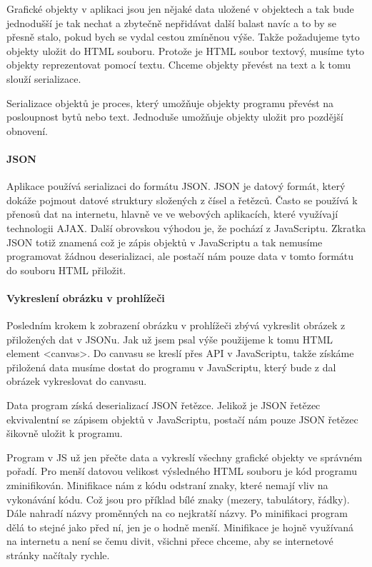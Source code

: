 \documentclass[
  field=inf,
  biblatex,
  glossaries,
  index
]{kidiplom}
\begin{document}
Grafické objekty v aplikaci jsou jen nějaké data uložené v objektech a tak bude jednodušší je tak nechat a zbytečně nepřidávat další balast navíc a to by se přesně stalo, pokud bych se vydal cestou zmíněnou výše. Takže požadujeme tyto objekty uložit do HTML souboru. Protože je HTML soubor textový, musíme tyto objekty reprezentovat pomocí textu. Chceme objekty převést na text a k tomu slouží serializace.

Serializace objektů je proces, který umožňuje objekty programu převést na posloupnost bytů nebo text. Jednoduše umožňuje objekty uložit pro pozdější obnovení.



\paragraph{JSON}
Aplikace používá serializaci do formátu JSON. JSON je datový formát, který dokáže pojmout datové struktury složených z čísel a řetězců. Často se používá k přenosů dat na internetu, hlavně ve ve webových aplikacích, které využívají technologii AJAX. Další obrovskou výhodou je, že pochází z JavaScriptu. Zkratka JSON totiž znamená  což je zápis objektů v JavaScriptu a tak nemusíme programovat žádnou deserializaci, ale postačí nám pouze data v tomto formátu do souboru HTML přiložit.


\paragraph{Vykreslení obrázku v prohlížeči}
Posledním krokem k zobrazení obrázku v prohlížeči zbývá vykreslit obrázek z přiložených dat v JSONu. Jak už jsem psal výše použijeme k tomu HTML element <canvas>. Do canvasu se kreslí přes API v JavaScriptu, takže získáme přiložená data musíme dostat do programu v JavaScriptu, který bude z dal obrázek vykreslovat do canvasu. 

Data program získá deserializací JSON řetězce. Jelikož je JSON řetězec ekvivalentní se zápisem objektů v JavaScriptu, postačí nám pouze JSON řetězec šikovně uložit k programu.

Program v JS už jen přečte data a vykreslí všechny grafické objekty ve správném pořadí. Pro menší datovou velikost výsledného HTML souboru je kód programu zminifikován. Minifikace nám z kódu odstraní znaky, které nemají vliv na vykonávání kódu. Což jsou pro příklad bílé znaky (mezery, tabulátory, řádky). Dále nahradí názvy proměnných na co nejkratší názvy. Po minifikaci program dělá to stejné jako před ní, jen je o hodně menší. Minifikace je hojně využívaná na internetu a není se čemu divit, všichni přece chceme, aby se internetové stránky načítaly rychle.
\end{document}
